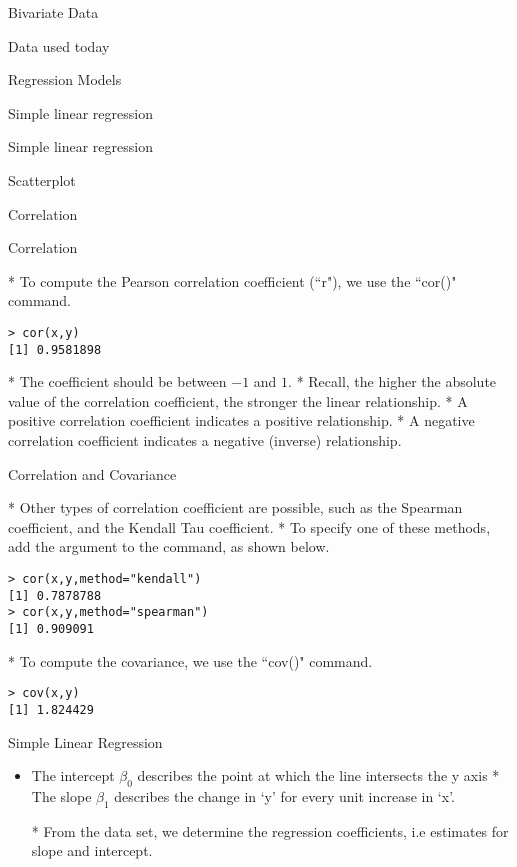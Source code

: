 \begin{slide}{Bivariate Data}
\begin{slide}{Data used today}
\begin{slide}{Regression Models}
\begin{slide}{Simple linear regression}
\begin{slide}{Simple linear regression}
\begin{slide}{Scatterplot}
\begin{slide}{Correlation}



\begin{slide}{Correlation}
\begin{itemize}
* To compute the Pearson correlation coefficient (``r"), we use the ``cor()" command.
\begin{verbatim}
> cor(x,y)
[1] 0.9581898
\end{verbatim}
* The coefficient should be between $-1$ and $1$.
* Recall, the higher the absolute value of the correlation coefficient, the stronger the linear relationship.
* A positive correlation coefficient indicates a positive relationship.
* A negative correlation coefficient indicates a negative (inverse) relationship.
\end{itemize}


\begin{slide}{Correlation and Covariance}
\begin{itemize}
* Other types of correlation coefficient are possible, such as the Spearman coefficient, and the Kendall Tau coefficient.
* To specify one of these methods, add the argument to the command, as shown below.
 \begin{verbatim}
> cor(x,y,method="kendall")
[1] 0.7878788
> cor(x,y,method="spearman")
[1] 0.909091
\end{verbatim}

* To compute the covariance, we use the ``cov()" command.
\begin{verbatim}
> cov(x,y)
[1] 1.824429
\end{verbatim}

\end{itemize}


\begin{slide}{Simple Linear Regression}



\begin{itemize}
* Basic regression model :
$y=\beta_{0} + \beta_{1}x + \epsilon$

\item
The intercept $\beta_{0}$ describes the point at which the line intersects
the y axis
* The slope $\beta_{1}$ describes the change in `y'  for every unit increase in `x'.

* From the data set, we determine the regression coefficients, i.e estimates for slope and intercept.


\end{itemize}
\end{slide}
\end{slide}
\end{slide}
\end{slide}
\end{slide}
\end{slide}
\end{slide}
\end{slide}
\end{slide}
\end{slide}
